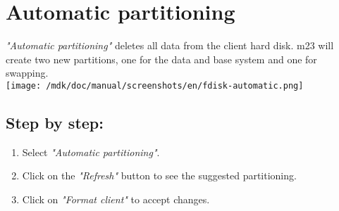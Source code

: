 \section{Automatic partitioning}\textit{"Automatic partitioning"} deletes all data from the client hard disk. m23 will create two new partitions, one for the data and base system and one for swapping.\\
\texttt{[image: /mdk/doc/manual/screenshots/en/fdisk-automatic.png]} \\
\subsection{Step by step:}
\begin{enumerate}
\item Select \textit{"Automatic partitioning"}.\\
\item Click on the \textit{"Refresh"} button to see the suggested partitioning.\\
\item Click on \textit{"Format client"} to accept changes.\\
\end{enumerate}
